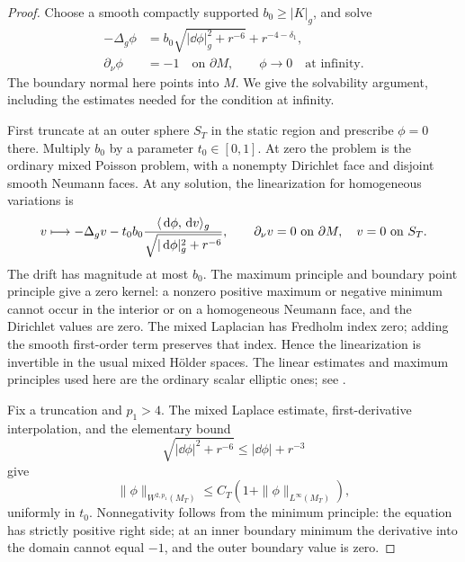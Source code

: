 \begin{proof}
Choose a smooth compactly supported \(b_0\ge|K|_g\), and solve
\begin{equation}\label{four:end:strictification-equation}
 \begin{split}
 -\Delta_g\phi
   &=b_0\sqrt{|\dd\phi|_g^2+r^{-6}}+r^{-4-\delta_1},\\
 \partial_\nu\phi&=-1\quad\text{on }\partial M,
 \qquad\phi\longrightarrow0\quad\text{at infinity}.
 \end{split}
\end{equation}
The boundary normal here points into \(M\). We give the solvability
argument, including the estimates needed for the condition at infinity.

First truncate at an outer sphere \(S_T\) in the static region and
prescribe \(\phi=0\) there. Multiply \(b_0\) by a parameter
\(t_0\in[0,1]\). At zero the problem is the ordinary mixed Poisson
problem, with a nonempty Dirichlet face and disjoint smooth Neumann
faces. At any solution, the linearization for homogeneous variations is
\[
 v\longmapsto-\Delta_gv
    -t_0b_0\frac{\langle\,\mathrm d\phi,\,\mathrm d v\rangle_g}
                    {\sqrt{|\,\mathrm d\phi|_g^2+r^{-6}}},
 \qquad \partial_\nu v=0\text{ on }\partial M,\quad v=0\text{ on }S_T.
\]
The drift has magnitude at most \(b_0\). The maximum principle and
boundary point principle give a zero kernel: a nonzero positive maximum
or negative minimum cannot occur in the interior or on a homogeneous
Neumann face, and the Dirichlet values are zero. The mixed Laplacian
has Fredholm index zero; adding the smooth first-order term preserves
that index. Hence the linearization is invertible in the usual mixed
H\"older spaces. The linear estimates and maximum principles used here
are the ordinary scalar elliptic ones; see \cite{GilbargTrudinger2001}.

Fix a truncation and \(p_1>4\). The mixed Laplace estimate,
first-derivative interpolation, and the elementary bound
\[\sqrt{|\dd\phi|^2+r^{-6}}\le|\dd\phi|+r^{-3}\]
give
\begin{equation}\label{four:end:strictification-local-bound}
 \|\phi\|_{W^{2,p_1}(M_T)}
       \le C_T(1+\|\phi\|_{L^\infty(M_T)}),
\end{equation}
uniformly in \(t_0\). Nonnegativity follows from the minimum principle:
the equation has strictly positive right side; at an inner boundary
minimum the derivative into the domain cannot equal \(-1\), and the
outer boundary value is zero.


\end{proof}
